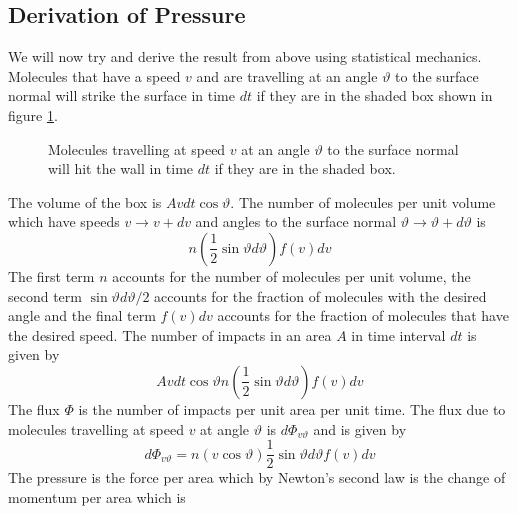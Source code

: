 \documentclass{article}
\begin{document}
    \subsection{Derivation of Pressure}
    We will now try and derive the result from above using statistical mechanics.
    Molecules that have a speed \(v\) and are travelling at an angle \(\vartheta\) to the surface normal will strike the surface in time \(dt\) if they are in the shaded box shown in figure \ref{fig:molecules that will hit the wall}.
    \begin{figure}[ht]
        \centering
        \caption{Molecules travelling at speed \(v\) at an angle \(\vartheta\) to the surface normal will hit the wall in time \(dt\) if they are in the shaded box.}
        \label{fig:molecules that will hit the wall}
    \end{figure}
    The volume of the box is \(Avdt\cos\vartheta\).
    The number of molecules per unit volume which have speeds \(v\to v+dv\) and angles to the surface normal \(\vartheta\to\vartheta + d\vartheta\) is
    \[n\left(\frac{1}{2}\sin\vartheta d\vartheta\right)f(v)dv\]
    The first term \(n\) accounts for the number of molecules per unit volume, the second term \(\sin\vartheta d\vartheta/2\) accounts for the fraction of molecules with the desired angle and the final term \(f(v)dv\) accounts for the fraction of molecules that have the desired speed.
    The number of impacts in an area \(A\) in time interval \(dt\) is given by
    \[Avdt\cos\vartheta n\left(\frac{1}{2}\sin\vartheta d\vartheta\right)f(v)dv\]
    The flux \(\Phi\) is the number of impacts per unit area per unit time.
    The flux due to molecules travelling at speed \(v\) at angle \(\vartheta\) is \(d\Phi_{v\vartheta}\) and is given by
    \[d\Phi_{v\vartheta} = n(v\cos\vartheta)\frac{1}{2}\sin\vartheta d\vartheta f(v)dv\]
    The pressure is the force per area which by Newton's second law is the change of momentum per area which is
\end{document}
